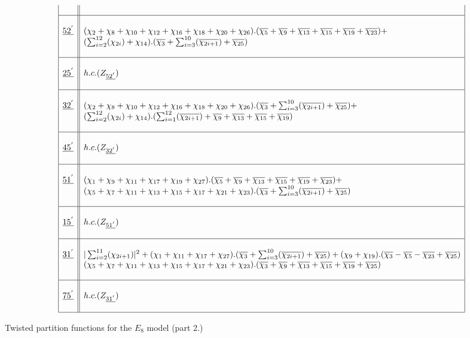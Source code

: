 \documentclass[a4paper,11pt]{article}
\newcommand{\ch}[1]{\chi_{#1}}
\newcommand{\och}[1]{\overline{\chi_{#1}}}
\newcommand{\ud}[1]{\underline{#1}}
\begin{document}
\begin{table}
$$\begin{array}{|c||l|}
{}  & {} \\
\hline
{}  & {} \\
\ud{52^{'}}  & (\ch{2} + \ch{8} + \ch{10} + \ch{12} + \ch{16} +
\ch{18} + \ch{20}+ \ch{26}).(\och{5} + \och{9} + \och{13} + \och{15}
+ \och{19} + \och{23}) + \\
{}  & (\sum_{i=2}^{12}(\ch{2i}) + \ch{14}).(\och{3} +
\sum_{i=3}^{10}(\och{2i+1}) + \och{25}) \\
{}  & {} \\
\hline
{}  & {} \\
\ud{25^{'}}  & h.c.(Z_{\ud{52^{'}}}) \\
{}  & {} \\
\hline
{}  & {} \\
\ud{32^{'}}  & (\ch{2} + \ch{8} + \ch{10} + \ch{12} + \ch{16} +
\ch{18} + \ch{20}+ \ch{26}).(\och{3} + \sum_{i=3}^{10}(\och{2i+1}) +
\och{25})+  \\
{}  & (\sum_{i=2}^{12}(\ch{2i}) +
\ch{14}).(\sum_{i=1}^{12}(\och{2i+1}) + \och{9} + \och{13} + \och{15}
+ \och{19}) \\
{}  & {} \\
\hline
{}  & {} \\
\ud{45^{'}}  & h.c.(Z_{\ud{32^{'}}}) \\
{}  & {} \\
\hline
{}  & {} \\
\ud{51^{'}}  & (\ch{1} + \ch{9} + \ch{11} + \ch{17} + \ch{19} +
\ch{27}).(\och{5} + \och{9} + \och{13} + \och{15} + \och{19} +
\och{23}) + \\
{}  & (\ch{5} + \ch{7} + \ch{11} + \ch{13} + \ch{15} + \ch{17} +
\ch{21}+ \ch{23}).(\och{3} + \sum_{i=3}^{10}(\och{2i+1}) + \och{25})
\\
{}  & {} \\
\hline
{}  & {} \\
\ud{15^{'}}  & h.c.(Z_{\ud{51^{'}}}) \\
{}  & {} \\
\hline
{}  & {} \\
\ud{31^{'}}  & |\sum_{i=2}^{11}(\ch{2i+1})|^2 + (\ch{1} + \ch{11} +
\ch{17} + \ch{27}).(\och{3} + \sum_{i=3}^{10}(\och{2i+1}) + \och{25})
+ (\ch{9} + \ch{19}) .(\och{3} - \och{5} - \och{23} + \och{25})\\
{}  & (\ch{5} + \ch{7} + \ch{11} + \ch{13} + \ch{15} + \ch{17} +
\ch{21}+ \ch{23}).(\och{3} + \och{9} + \och{13} + \och{15} + \och{19}
+ \och{25}) \\
{}  & {} \\
\hline
{}  & {} \\
\ud{75^{'}}  & h.c.(Z_{\ud{31^{'}}}) \\
{}  & {} \\
\hline
\end{array}
$$
\normalsize
\caption{Twisted partition functions for the $E_8$ model (part 2.)}
\end{table}
\end{document}
